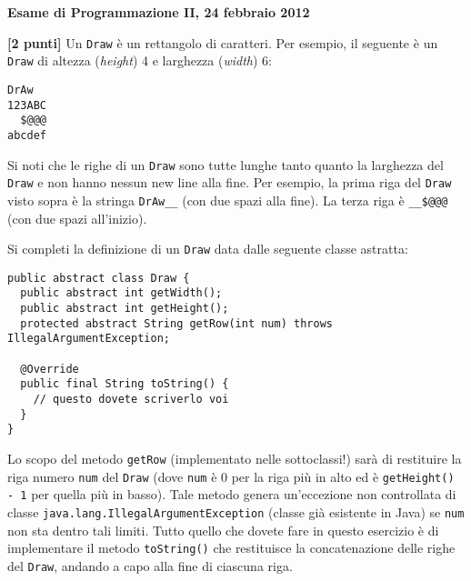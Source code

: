\documentclass{article}[10pt]
\newcounter{esnu}
\newenvironment{esercizio}{\medskip \noindent {\bf Esercizio\addtocounter{esnu}{1} \arabic{esnu}}}{}
\begin{document}
\begin{center} {\bf Esame di Programmazione II, 24 febbraio 2012}\end{center}

\begin{esercizio}
\textbf{[2 punti]}
Un \texttt{Draw} \`e un rettangolo di caratteri. Per esempio, il seguente \`e un \texttt{Draw} di
altezza (\emph{height}) 4 e larghezza (\emph{width}) 6:
%
{\small
\begin{verbatim}
DrAw
123ABC
  $@@@
abcdef
\end{verbatim}
}

\noindent
Si noti che le righe di un \texttt{Draw} sono tutte lunghe tanto quanto la larghezza del \texttt{Draw}
e non hanno nessun new line alla fine. Per esempio, la prima riga del \texttt{Draw} visto sopra \`e
la stringa \texttt{DrAw\_\_} (con due spazi alla fine).
La terza riga \`e \texttt{\_\_\$@@@} (con due spazi all'inizio).

Si completi la definizione di un \texttt{Draw} data dalle seguente classe astratta:
%
{\small
\begin{verbatim}
public abstract class Draw {
  public abstract int getWidth();
  public abstract int getHeight();
  protected abstract String getRow(int num) throws IllegalArgumentException;

  @Override
  public final String toString() {
    // questo dovete scriverlo voi
  }
}
\end{verbatim}
}

\noindent
Lo scopo del metodo \texttt{getRow} (implementato nelle sottoclassi!) sar\`a di restituire la riga
numero \texttt{num} del \texttt{Draw} (dove \texttt{num} \`e 0 per la riga pi\`u in alto ed \`e
\texttt{getHeight() - 1} per quella pi\`u in basso). Tale metodo genera un'eccezione non controllata di classe
\texttt{java.lang.IllegalArgumentException} (classe gi\`a esistente in Java)
se \texttt{num} non sta dentro tali limiti. Tutto quello che dovete fare in questo
esercizio \`e di implementare
il metodo \texttt{toString()} che restituisce la concatenazione delle righe del \texttt{Draw}, andando
a capo alla fine di ciascuna riga.
\end{esercizio}
\end{document}
